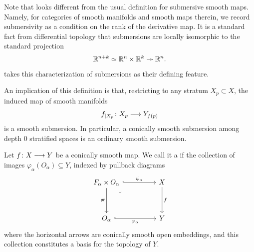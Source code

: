 \begin{remark}\label{ch4:: rmk: con sm submersions}
    Note that  looks different from the usual definition for submersive smooth maps. Namely, for categories of smooth manifolds and smooth maps therein, we record submersivity as a condition on the rank of the derivative map. It is a standard fact from differential topology that submersions are locally isomorphic to the standard projection
    \begin{equation}
    \mathbb R^{n+k} \simeq \mathbb R^n \times \mathbb R^k\twoheadrightarrow \mathbb R^n.
    \end{equation}
     takes this characterization of submersions as their defining feature.
\end{remark}
\begin{observation}
    An implication of this definition is that, restricting to any stratum $X_p \subset X$, the induced map of smooth manifolds
    \begin{equation}
        f_{|X_p}\colon X_p \longrightarrow Y_{f(p)}
    \end{equation}
    is a smooth submersion. In particular, a conically smooth submersion among depth $0$ stratified spaces is an ordinary smooth submersion.
\end{observation}


\begin{definition}\label{ch4:: def: con sm fiber bundles}
    Let $f\colon X \longrightarrow Y$ be a conically smooth map. We call it a  if the collection of images $\varphi_\alpha(O_\alpha)\subseteq Y$, indexed by pullback diagrams 
    \begin{equation}\label{eq:def:fiber bundle}
    \begin{tikzcd}[ampersand replacement=\&]
	{F_\alpha\times O_\alpha } \&\& X \\
	\\
	{O_\alpha} \&\& Y
	\arrow["{\psi_{\alpha}}", hook, from=1-1, to=1-3]
	\arrow["{\sf pr}"', from=1-1, to=3-1]
	\arrow["\lrcorner"{anchor=center, pos=0.125}, draw=none, from=1-1, to=3-3]
	\arrow["f", from=1-3, to=3-3]
	\arrow["{\varphi_\alpha}"', hook, from=3-1, to=3-3]
    \end{tikzcd}
    \end{equation}
    where the horizontal arrows are conically smooth open embeddings, and this collection constitutes a basis for the topology of $Y$.
\end{definition}

